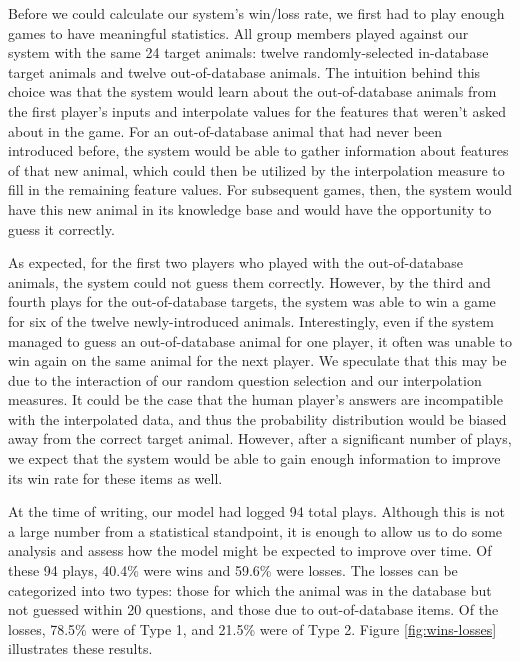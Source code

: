 \documentclass[11pt,a4paper]{article}
\begin{document}
Before we could calculate our system's win/loss rate, we first had to play enough games to have meaningful statistics. 
All group members played against our system with the same 24 target animals: twelve randomly-selected in-database target animals and twelve out-of-database animals. 
The intuition behind this choice was that the system would learn about the out-of-database animals from the first player's inputs and interpolate values for the features that weren't asked about in the game. 
For an out-of-database animal that had never been introduced before, the system would be able to gather information about features of that new animal, which could then be utilized by the interpolation measure to fill in the remaining feature values. 
For subsequent games, then, the system would have this new animal in its knowledge base and would have the opportunity to guess it correctly. 

As expected, for the first two players who played with the out-of-database animals, the system could not guess them correctly.
However, by the third and fourth plays for the out-of-database targets, the system was able to win a game for six of the twelve newly-introduced animals.
Interestingly, even if the system managed to guess an out-of-database animal for one player, it often was unable to win again on the same animal for the next player.
We speculate that this may be due to the interaction of our random question selection and our interpolation measures. 
It could be the case that the human player's answers are incompatible with the interpolated data, and thus the probability distribution would be biased away from the correct target animal. 
However, after a significant number of plays, we expect that the system would be able to gain enough information to improve its win rate for these items as well.

At the time of writing, our model had logged 94 total plays. 
Although this is not a large number from a statistical standpoint, it is enough to allow us to do some analysis and assess how the model might be expected to improve over time. 
Of these 94 plays, 40.4\% were wins and 59.6\% were losses. 
The losses can be categorized into two types: those for which the animal was in the database but not guessed within 20 questions, and those due to out-of-database items. 
Of the losses, 78.5\% were of Type 1, and 21.5\% were of Type 2. 
Figure \ref{fig:wins-losses} illustrates these results. 
\end{document}
